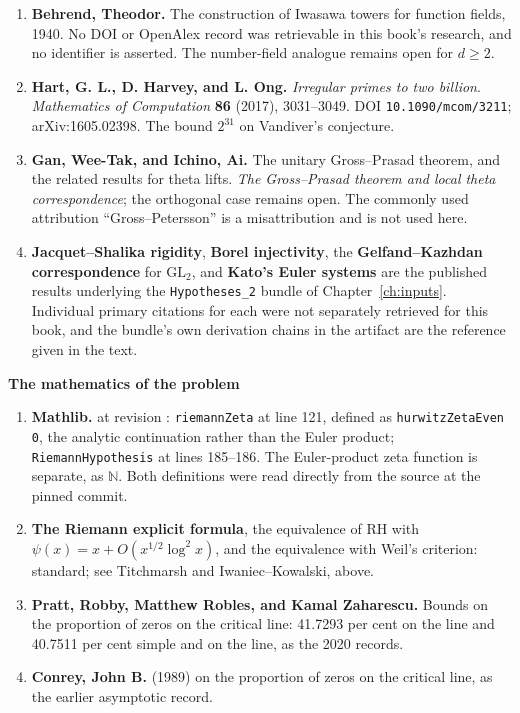 \begin{enumerate}[leftmargin=1.4em,itemsep=4pt,start=14]
{Normale Supérieure} \textbf{30} (1997), no.~1, 229--288.
DOI . The precise ``slope inequality''
as used in the argument was not retrieved from a primary text and is therefore
paraphrased rather than quoted in this book.
\item \textbf{Behrend, Theodor.} The construction of Iwasawa towers for
function fields, 1940. No DOI or OpenAlex record was retrievable in this
book's research, and no identifier is asserted. The number-field analogue
remains open for $d \ge 2$.
\item \textbf{Hart, G. L., D. Harvey, and L. Ong.} \emph{Irregular primes to two
billion}. \emph{Mathematics of Computation} \textbf{86} (2017), 3031--3049.
DOI \texttt{10.1090/mcom/3211}; arXiv:1605.02398. The bound $2^{31}$ on
Vandiver's conjecture.
\item \textbf{Gan, Wee-Tak, and Ichino, Ai.} The unitary Gross--Prasad
theorem, and the related results for theta lifts. \emph{The Gross--Prasad
theorem and local theta correspondence}; the orthogonal case remains open.
The commonly used attribution ``Gross--Petersson'' is a misattribution and is
not used here.
\item \textbf{Jacquet--Shalika rigidity}, \textbf{Borel injectivity}, the
\textbf{Gelfand--Kazhdan correspondence} for $\mathrm{GL}_2$, and
\textbf{Kato's Euler systems} are the published results underlying the
\texttt{Hypotheses\_2} bundle of Chapter~\ref{ch:inputs}. Individual primary citations for
each were not separately retrieved for this book, and the bundle's own
derivation chains in the artifact are the reference given in the text.
\end{enumerate}

\vspace{8pt}
{\sffamily\bfseries\small The mathematics of the problem}

\begin{enumerate}[leftmargin=1.4em,itemsep=4pt,start=26]
\item \textbf{Mathlib.} 
at revision :
\texttt{riemannZeta} at line 121, defined as \texttt{hurwitzZetaEven 0}, the
analytic continuation rather than the Euler product; \texttt{RiemannHypothesis}
at lines 185--186. The Euler-product zeta function is separate, as
 $\mathbb{N}$. Both definitions were read directly
from the source at the pinned commit.
\item \textbf{The Riemann explicit formula}, the equivalence of RH with
$\psi(x) = x + O(x^{1/2}\log^2 x)$, and the equivalence with Weil's criterion:
standard; see Titchmarsh and Iwaniec--Kowalski, above.
\item \textbf{Pratt, Robby, Matthew Robles, and Kamal Zaharescu.} Bounds on the
proportion of zeros on the critical line: 41.7293 per cent on the line and
40.7511 per cent simple and on the line, as the 2020 records.
\item \textbf{Conrey, John B.} (1989) on the proportion of zeros on the
critical line, as the earlier asymptotic record.
\end{enumerate}

